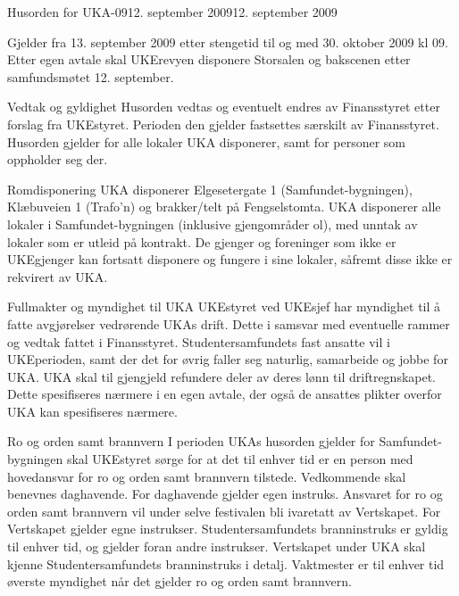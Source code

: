 \documentclass[../fsbok.tex]{subfiles}
\begin{document}
\begin{instruks}{Husorden for UKA-09}{12. september 2009}{12. september 2009}

Gjelder fra 13. september 2009 etter stengetid til og med 30. oktober 2009 kl 09.
Etter egen avtale skal UKErevyen disponere Storsalen og bakscenen etter samfundsmøtet 12.
september.


\begin{instruksledd}{Vedtak og gyldighet}
Husorden vedtas og eventuelt endres av Finansstyret etter forslag fra UKEstyret. Perioden
den gjelder fastsettes særskilt av Finansstyret. Husorden gjelder for alle lokaler UKA
disponerer, samt for personer som oppholder seg der.
\end{instruksledd}

\begin{instruksledd}{Romdisponering}
UKA disponerer Elgesetergate 1 (Samfundet-bygningen), Klæbuveien 1 (Trafo’n) og
brakker/telt på Fengselstomta. UKA disponerer alle lokaler i Samfundet-bygningen (inklusive
gjengområder ol), med unntak av lokaler som er utleid på kontrakt. De gjenger og
foreninger som ikke er UKEgjenger kan fortsatt disponere og fungere i sine lokaler, såfremt
disse ikke er rekvirert av UKA.
\end{instruksledd}

\begin{instruksledd}{Fullmakter og myndighet til UKA}
UKEstyret ved UKEsjef har myndighet til å fatte avgjørelser vedrørende UKAs drift. Dette i
samsvar med eventuelle rammer og vedtak fattet i Finansstyret. Studentersamfundets fast
ansatte vil i UKEperioden, samt der det for øvrig faller seg naturlig, samarbeide og jobbe for
UKA. UKA skal til gjengjeld refundere deler av deres lønn til driftregnskapet. Dette
spesifiseres nærmere i en egen avtale, der også de ansattes plikter overfor UKA kan
spesifiseres nærmere.
\end{instruksledd}

\begin{instruksledd}{Ro og orden samt brannvern}
I perioden UKAs husorden gjelder for Samfundet-bygningen skal UKEstyret sørge for at det
til enhver tid er en person med hovedansvar for ro og orden samt brannvern tilstede.
Vedkommende skal benevnes daghavende. For daghavende gjelder egen instruks. Ansvaret
for ro og orden samt brannvern vil under selve festivalen bli ivaretatt av Vertskapet. For
Vertskapet gjelder egne instrukser. Studentersamfundets branninstruks er gyldig til enhver
tid, og gjelder foran andre instrukser. Vertskapet under UKA skal kjenne
Studentersamfundets branninstruks i detalj. Vaktmester er til enhver tid øverste myndighet
når det gjelder ro og orden samt brannvern.
\end{instruksledd}


\end{instruks}
\end{document}
